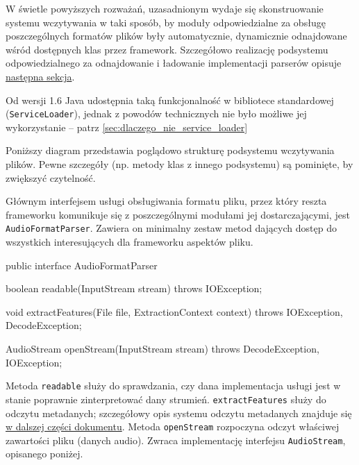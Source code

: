 W świetle powyższych rozważań, uzasadnionym wydaje się skonstruowanie systemu wczytywania w taki
sposób, by moduły odpowiedzialne za obsługę poszczególnych formatów plików były automatycznie,
dynamicznie odnajdowane wśród dostępnych klas przez framework. Szczegółowo realizację podsystemu
odpowiedzialnego za odnajdowanie i ładowanie implementacji parserów opisuje
\hyperref[sec:odnajdywanie_implementacji]{następna sekcja}.

\begin{Note}
Od wersji 1.6 Java udostępnia taką funkcjonalność w bibliotece standardowej
(\texttt{ServiceLoader}), jednak z powodów technicznych nie było możliwe jej wykorzystanie -- patrz
\ref{sec:dlaczego_nie_service_loader}
\end{Note}

\bigskip

Poniższy diagram przedstawia poglądowo strukturę podsystemu wczytywania plików. Pewne szczegóły (np.
metody klas z innego podsystemu) są pominięte, by zwiększyć czytelność.


Głównym interfejsem usługi obsługiwania formatu pliku, przez który reszta frameworku komunikuje się
z poszczególnymi modułami jej dostarczającymi, jest \texttt{AudioFormatParser}. Zawiera on minimalny
zestaw metod dających dostęp do wszystkich interesujących dla frameworku aspektów pliku.

\begin{java}
public interface AudioFormatParser {

    boolean readable(InputStream stream) throws IOException;

    void extractFeatures(File file, ExtractionContext context) throws IOException, DecodeException;

    AudioStream openStream(InputStream stream) throws DecodeException, IOException;

}
\end{java}

Metoda \texttt{readable} służy do sprawdzania, czy dana implementacja usługi jest w stanie poprawnie
zinterpretować dany strumień. \texttt{extractFeatures} służy do odczytu metadanych; szczegółowy opis
systemu odczytu metadanych znajduje się \hyperref[sec:metadane]{w dalszej części dokumentu}. Metoda
\texttt{openStream} rozpoczyna odczyt właściwej zawartości pliku (danych audio). Zwraca
implementację interfejsu \texttt{AudioStream}, opisanego poniżej.

